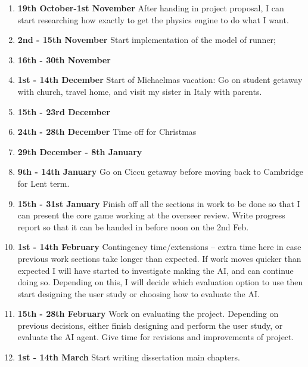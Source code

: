 \documentclass[12pt,a4paper,twoside]{article}
\begin{document}
\begin{enumerate}
\item \textbf{19th October-1st November} After handing in project proposal, I can start researching how exactly to get the physics engine to do what I want. 

\item \textbf{2nd - 15th November} Start implementation of the model of runner; \WorkA
\WorkB


\item \textbf{16th - 30th November}
\WorkC
\WorkD

\item \textbf{1st - 14th December}
Start of Michaelmas vacation: Go on student getaway with church, travel home, and visit my sister in Italy with parents.
\item \textbf{15th - 23rd December}
\WorkE
\WorkF
\item \textbf{24th - 28th December}
Time off for Christmas
\item \textbf{29th December - 8th January}
\WorkG
\WorkH
\item \textbf{9th - 14th January}
Go on Ciccu getaway before moving back to Cambridge for Lent term.

\item \textbf{15th - 31st January}
Finish off all the sections in work to be done so that I can present the core game working at the overseer review.
Write progress report so that it can be handed in before noon on the 2nd Feb.

\item \textbf{1st - 14th February}
Contingency time/extensions -- extra time here in case previous work sections take longer than expected. If work moves quicker than expected I will have started to investigate making the AI, and can continue doing so.
Depending on this, I will decide which evaluation option to use then start designing the user study or choosing how to evaluate the AI.


\item \textbf{15th - 28th February}
Work on evaluating the project. Depending on previous decisions, either finish designing and perform the user study, or evaluate the AI agent.
Give time for revisions and improvements of project.

\item \textbf{1st - 14th March}
Start writing dissertation main chapters.



\end{enumerate}
\end{document}

